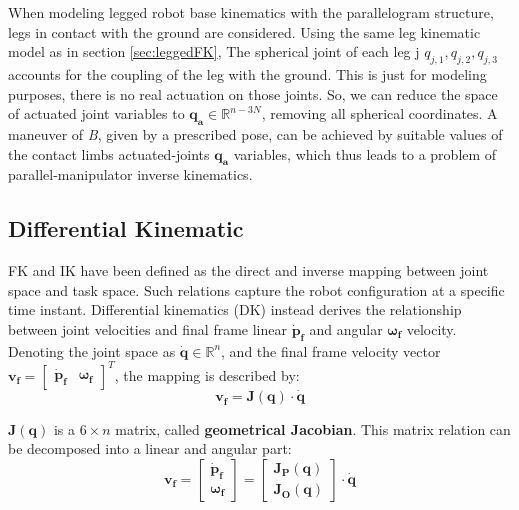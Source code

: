 When modeling legged robot base kinematics with the parallelogram structure, legs in contact with the ground are considered. 
Using the same leg kinematic model as in section \ref{sec:leggedFK}, The spherical joint of each leg j $q_{j,1}, q_{j,2},q_{j,3}$ accounts for the coupling of the leg with the ground. This is just for modeling purposes, there is no real actuation on those joints. So, we can reduce the space of actuated joint variables to  $\mathbf
{q_a} \in \mathbb{R}^{n-3N}$, removing all spherical coordinates.
A maneuver of \textit{B}, given by a prescribed pose, can be achieved by
suitable values of the contact limbs actuated-joints $\mathbf
{q_a}$ variables, which thus leads to a problem of parallel-manipulator inverse kinematics\cite{RoboticMechanics}.


\subsection{Differential Kinematic}
\label{sec:differential}
FK and IK have been defined as the direct and inverse mapping between joint space and task space. Such relations capture the robot configuration at a specific time instant. Differential kinematics (DK) instead derives the relationship between joint velocities and final frame linear $\mathbf{\dot{p}_f}$ and angular $\mathbf{\omega_f}$ velocity\cite{Siciliano}.
Denoting the joint space as $\mathbf{\dot{q}} \in \mathbb{R}^n$, and the final frame velocity vector
$\mathbf{v_f} =
\begin{bmatrix}
\mathbf{\dot{p}_f} & \mathbf{\omega_f}
\end{bmatrix}^T$, the mapping is described by: 
\begin{equation}
\label{eq:DK}
    \mathbf{v_f} = \mathbf{J(\mathbf{q})}\cdot\mathbf{\dot{q}} 
\end{equation}

$\mathbf{J(\mathbf{q})}$ is a $6\times n$ matrix, called \textbf{geometrical Jacobian}. This matrix relation can be decomposed into a linear and angular part: 
\begin{equation}
\label{eq:DK_decomposed}
    \mathbf{v_f} =
    \begin{bmatrix}
    \mathbf{\dot{p}_f}\\
    \mathbf{\omega_f}
    \end{bmatrix} = 
    \begin{bmatrix}
    \mathbf{J_P(\mathbf{q})}\\
    \mathbf{J_O(\mathbf{q})}    \end{bmatrix} \cdot \mathbf{\dot{q}} 
\end{equation}

